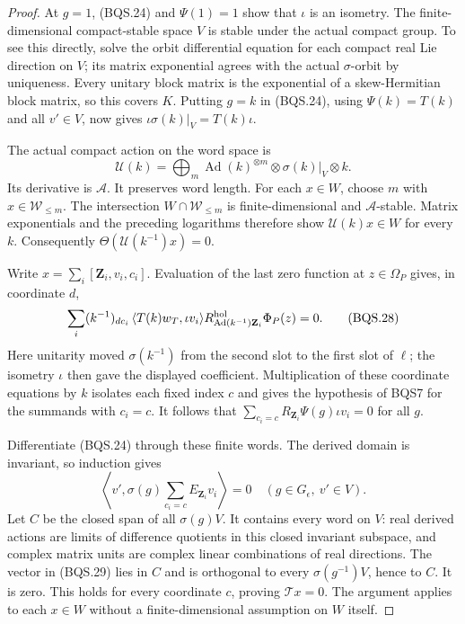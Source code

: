 \begin{proof}
At $g=1$, (BQS.24) and $\Psi(1)=1$ show that $\iota$ is an isometry.
The finite-dimensional compact-stable space $V$ is stable under the
actual compact group.  To see this directly, solve the orbit differential
equation for each compact real Lie direction on $V$; its matrix
exponential agrees with the actual $\sigma$-orbit by uniqueness.
Every unitary block matrix is the exponential of a skew-Hermitian block
matrix, so this covers $K$.
Putting $g=k$ in (BQS.24), using $\Psi(k)=T(k)$ and all $v'\in V$,
now gives $\iota\sigma(k)|_V=T(k)\iota$.

The actual compact action on the word space is
\[
 \mathcal U(k)=
  \bigoplus_m\operatorname{Ad}(k)^{\otimes m}
                    \otimes\sigma(k)|_V\otimes k.
 \tag{BQS.27}
\]
Its derivative is $\mathcal A$.  It preserves word length.
For each $x\in W$, choose $m$ with $x\in\mathcal W_{\le m}$.
The intersection $W\cap\mathcal W_{\le m}$ is finite-dimensional and
$\mathcal A$-stable.  Matrix exponentials and the preceding logarithms
therefore show $\mathcal U(k)x\in W$ for every $k$.
Consequently $\Theta(\mathcal U(k^{-1})x)=0$.

Write $x=\sum_i[\mathbf Z_i,v_i,c_i]$.
Evaluation of the last zero function at $z\in\Omega_P$ gives, in
coordinate $d$,
\[
 \sum_i(k^{-1})_{dc_i}\,
   \langle T(k)w_T,\iota v_i\rangle
   R^{\rm hol}_{\operatorname{Ad}(k^{-1})\mathbf Z_i}
                                 \Phi_P(z)=0.
 \tag{BQS.28}
\]
Here unitarity moved $\sigma(k^{-1})$ from the second slot to the
first slot of $\ell$; the isometry $\iota$ then gave the displayed
coefficient.  Multiplication of these coordinate equations by $k$
isolates each fixed index $c$ and gives the hypothesis of BQS7 for
the summands with $c_i=c$.
It follows that
$\sum_{c_i=c}R_{\mathbf Z_i}\Psi(g)\iota v_i=0$
for all $g$.

Differentiate (BQS.24) through these finite words.  The derived
domain is invariant, so induction gives
\[
 \left\langle v',\sigma(g)
       \sum_{c_i=c}E_{\mathbf Z_i}v_i\right\rangle=0
             \quad(g\in G_\epsilon,\ v'\in V).
 \tag{BQS.29}
\]
Let $C$ be the closed span of all $\sigma(g)V$.  It contains every
word on $V$: real derived actions are limits of difference quotients
in this closed invariant subspace, and complex matrix units are
complex linear combinations of real directions.
The vector in (BQS.29) lies in $C$ and is orthogonal to every
$\sigma(g^{-1})V$, hence to $C$.  It is zero.
This holds for every coordinate $c$, proving $\mathcal T x=0$.
The argument applies to each $x\in W$ without a finite-dimensional
assumption on $W$ itself.
\end{proof}

